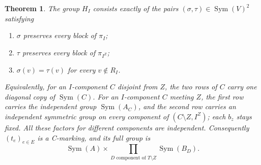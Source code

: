 \documentclass[a4paper,11pt]{article}
\newcommand{\Sym}{\operatorname{Sym}}
\newtheorem{theorem}{Theorem}\newtheorem{lemma}[theorem]{Lemma}\newtheorem{corollary}[theorem]{Corollary}
\begin{document}
\begin{theorem}\label{thm:deleted}
The group $H_I$ consists exactly of the pairs $(\sigma,\tau)\in\Sym(V)^2$
satisfying
\begin{enumerate}
\item $\sigma$ preserves every block of $\pi_I$;
\item $\tau$ preserves every block of $\pi_{I^Z}$;
\item $\sigma(v)=\tau(v)$ for every $v\notin R_I$.
\end{enumerate}
Equivalently, for an $I$-component $C$ disjoint from $Z$, the two rows of $C$
carry one diagonal copy of $\Sym(C)$. For an $I$-component $C$ meeting $Z$,
the first row carries the independent group $\Sym(A_C)$, and the second
row carries an independent symmetric group on every component of
$(C\setminus Z,I^Z)$; each $b_z$ stays fixed. All these factors for different
components are independent.
Consequently $(t_e)_{e\in E}$ is a C-marking, and its full group is
\[
 \Sym(A)\times\prod_{D\text{ component of }T\setminus Z}\Sym(B_D).
\]
\end{theorem}
\end{document}
